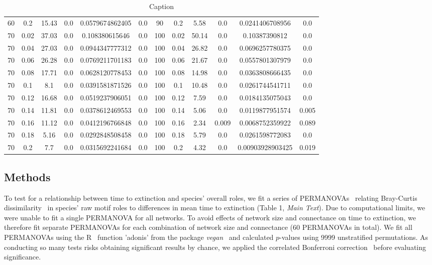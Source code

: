 \documentclass[12pt]{article}
\begin{document}
\begin{spacing}{2.0}
\begin{table}[]
\begin{tabular}{c c | c c | c c || c c | c c | c c |}
60&0.2&15.43&0.0&0.0579674862405&0.0&90&0.2&5.58&0.0&0.0241406708956&0.0\\
70&0.02&37.03&0.0&0.108380615646&0.0&100&0.02&50.14&0.0&0.10387390812&0.0\\
70&0.04&27.03&0.0&0.0944347777312&0.0&100&0.04&26.82&0.0&0.0696257780375&0.0\\
70&0.06&26.28&0.0&0.0769211701183&0.0&100&0.06&21.67&0.0&0.0557801307979&0.0\\
70&0.08&17.71&0.0&0.0628120778453&0.0&100&0.08&14.98&0.0&0.0363808666435&0.0\\
70&0.1&8.1&0.0&0.0391581871526&0.0&100&0.1&10.48&0.0&0.0261744541711&0.0\\
70&0.12&16.68&0.0&0.0519237906051&0.0&100&0.12&7.59&0.0&0.0184135075043&0.0\\
70&0.14&11.81&0.0&0.0378612469553&0.0&100&0.14&5.06&0.0&0.0119877951574&0.005\\
70&0.16&11.12&0.0&0.0412196766848&0.0&100&0.16&2.34&0.009&0.0068752359922&0.089\\
70&0.18&5.16&0.0&0.0292848508458&0.0&100&0.18&5.79&0.0&0.0261598772083&0.0\\
70&0.2&7.7&0.0&0.0315692241684&0.0&100&0.2&4.32&0.0&0.00903928903425&0.019\\
    \end{tabular}
    \caption{Caption}
    \label{tab:my_label}
\end{table}

	\subsection*{Methods}


		To test for a relationship between time to extinction and species' overall roles, we fit a series of PERMANOVAs~\citep{Anderson2001} relating Bray-Curtis dissimilarity~\citep{Baker2015,Cirtwill2015} in species' raw motif roles to differences in mean time to extinction (Table 1, \emph{Main Text}).
		Due to computational limits, we were unable to fit a single PERMANOVA for all networks.
		To avoid effects of network size and connectance on time to extinction, we therefore fit separate PERMANOVAs for each combination of network size and connectance (60 PERMANOVAs in total).
		We fit all PERMANOVAs using the R~\citep{R} function 'adonis' from the package \emph{vegan}~\citep{vegan} and calculated $p$-values using 9999 unstratified permutations.
		As conducting so many tests risks obtaining significant results by chance, we applied the correlated Bonferroni correction~\citep{Drezner2016} before evaluating significance.
		

\end{spacing}
\end{document}
